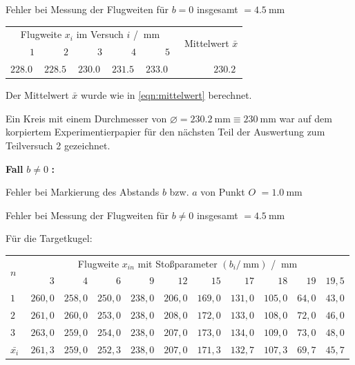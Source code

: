 \documentclass[twoside]{article}
\newcommand{\ra}[1]{\renewcommand{\arraystretch}{#1}}
\begin{document}
        Fehler bei Messung der Flugweiten für $b = 0$ insgesamt $= \SI{4.5}{\milli\meter}$

        \begin{center}
            \ra{1.2}
            \begin{tabular}{rrrrr r}
                \toprule
                \multicolumn{5}{c}{Flugweite $x_i$ im Versuch $i$ / $\SI{}{\milli\meter}$} & \multirow{2}{*}{~Mittelwert $\bar{x}$} \\
                \cmidrule{1-5} $1$ & $2$ & $3$ & $4$ & $5$ &  \\
                \midrule
                $\SI{228.0}{}$ & $\SI{228.5}{}$ & $\SI{230.0}{}$ & $\SI{231.5}{}$ & $\SI{233.0}{}$ & $\SI{230.2}{}$\\
                \bottomrule
            \end{tabular}
        \end{center}
        Der Mittelwert $\bar{x}$ wurde wie in \eqref{eqn:mittelwert} berechnet.

        Ein Kreis mit einem Durchmesser von $\varnothing = \SI{230.2}{\milli\meter} \equiv \SI{230}{\milli\meter}$ war auf dem korpiertem Experimentierpapier für den nächsten Teil der Auswertung zum Teilversuch 2 gezeichnet.

        \pagebreak
        \textbf{Fall} $b \neq 0$ \textbf{:}

        Fehler bei Markierung des Abstands $b$ bzw. $a$ von Punkt $O$ $= \SI{1.0}{\milli\meter}$ 

        Fehler bei Messung der Flugweiten für $b \neq 0$ insgesamt $= \SI{4.5}{\milli\meter}$

        Für die Targetkugel:
        \begin{center}
            \begin{tabular}{l rrrrrrrrrr}
                \toprule
                \multirow{2}{*}{$n$~} & \multicolumn{10}{c}{Flugweite $x_{in}$ mit Stoßparameter $\left(b_i/\SI{}{\milli\meter}\right)$ / $\SI{}{\milli\meter}$}  \\
                \cmidrule{2-11} & $3$ & $4$ & $6$ & $9$ & $12$ & $15$ & $17$ & $18$ & $19$ & $19,5$ \\
                \midrule
                $1$ & $260,0$ & $258,0$ & $250,0$ & $238,0$ & $206,0$ & $169,0$ & $131,0$ & $105,0$ & $64,0$ & $43,0$ \\
                $2$ & $261,0$ & $260,0$ & $253,0$ & $238,0$ & $208,0$ & $172,0$ & $133,0$ & $108,0$ & $72,0$ & $46,0$ \\
                $3$ & $263,0$ & $259,0$ & $254,0$ & $238,0$ & $207,0$ & $173,0$ & $134,0$ & $109,0$ & $73,0$ & $48,0$ \\
                \midrule
                $\bar{x_i}$ & $261,3$ & $259,0$ & $252,3$ & $238,0$ & $207,0$ & $171,3$ & $132,7$ & $107,3$ & $69,7$ & $45,7$ \\
                \bottomrule
            \end{tabular}
        \end{center}
        \vspace{0.5\baselineskip}
\end{document}
